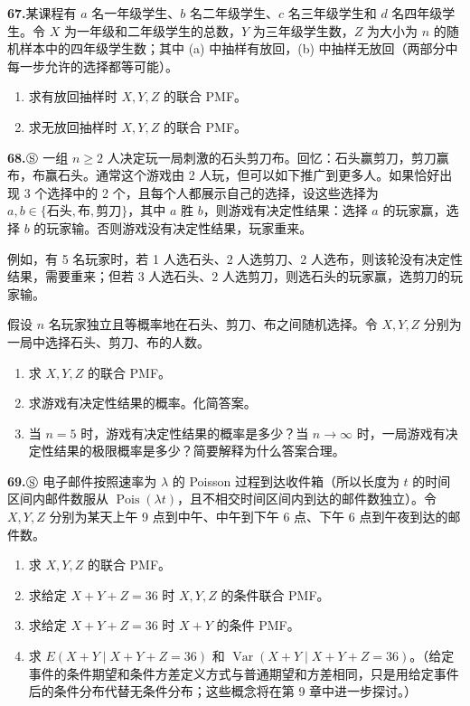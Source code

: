 \documentclass[UTF8, 12pt, fontset=fandol, oneside]{ctexart}
\begin{document}
\noindent\textbf{67.}\quad 某课程有 $a$ 名一年级学生、$b$ 名二年级学生、$c$ 名三年级学生和 $d$ 名四年级学生。令 $X$ 为一年级和二年级学生的总数，$Y$ 为三年级学生数，$Z$ 为大小为 $n$ 的随机样本中的四年级学生数；其中 (a) 中抽样有放回，(b) 中抽样无放回（两部分中每一步允许的选择都等可能）。
\begin{enumerate}
  \item[(a)] 求有放回抽样时 $X,Y,Z$ 的联合 PMF。
  \item[(b)] 求无放回抽样时 $X,Y,Z$ 的联合 PMF。
\end{enumerate}

\noindent\textbf{68.}\quad $\circledS$ 一组 $n\ge 2$ 人决定玩一局刺激的石头剪刀布。回忆：石头赢剪刀，剪刀赢布，布赢石头。通常这个游戏由 2 人玩，但可以如下推广到更多人。如果恰好出现 3 个选择中的 2 个，且每个人都展示自己的选择，设这些选择为 $a,b\in\{\text{石头},\text{布},\text{剪刀}\}$，其中 $a$ 胜 $b$，则游戏有决定性结果：选择 $a$ 的玩家赢，选择 $b$ 的玩家输。否则游戏没有决定性结果，玩家重来。

例如，有 5 名玩家时，若 1 人选石头、2 人选剪刀、2 人选布，则该轮没有决定性结果，需要重来；但若 3 人选石头、2 人选剪刀，则选石头的玩家赢，选剪刀的玩家输。

假设 $n$ 名玩家独立且等概率地在石头、剪刀、布之间随机选择。令 $X,Y,Z$ 分别为一局中选择石头、剪刀、布的人数。
\begin{enumerate}
  \item[(a)] 求 $X,Y,Z$ 的联合 PMF。
  \item[(b)] 求游戏有决定性结果的概率。化简答案。
  \item[(c)] 当 $n=5$ 时，游戏有决定性结果的概率是多少？当 $n\to\infty$ 时，一局游戏有决定性结果的极限概率是多少？简要解释为什么答案合理。
\end{enumerate}

\noindent\textbf{69.}\quad $\circledS$ 电子邮件按照速率为 $\lambda$ 的 Poisson 过程到达收件箱（所以长度为 $t$ 的时间区间内邮件数服从 $\operatorname{Pois}(\lambda t)$，且不相交时间区间内到达的邮件数独立）。令 $X,Y,Z$ 分别为某天上午 9 点到中午、中午到下午 6 点、下午 6 点到午夜到达的邮件数。
\begin{enumerate}
  \item[(a)] 求 $X,Y,Z$ 的联合 PMF。
  \item[(b)] 求给定 $X+Y+Z=36$ 时 $X,Y,Z$ 的条件联合 PMF。
  \item[(c)] 求给定 $X+Y+Z=36$ 时 $X+Y$ 的条件 PMF。
  \item[(d)] 求 $E(X+Y\mid X+Y+Z=36)$ 和 $\operatorname{Var}(X+Y\mid X+Y+Z=36)$。（给定事件的条件期望和条件方差定义方式与普通期望和方差相同，只是用给定事件后的条件分布代替无条件分布；这些概念将在第 9 章中进一步探讨。）
\end{enumerate}
\end{document}
